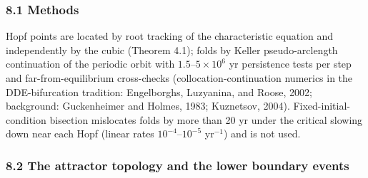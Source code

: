 \documentclass[11pt]{article}
\begin{document}
\subsubsection{8.1 Methods}\label{methods}

Hopf points are located by root tracking of the characteristic equation
and independently by the cubic (Theorem 4.1); folds by Keller
pseudo-arclength continuation of the periodic orbit with
\(1.5\)--\(5\times10^6\) yr persistence tests per step and
far-from-equilibrium cross-checks (collocation-continuation numerics in
the DDE-bifurcation tradition: Engelborghs, Luzyanina, and Roose, 2002;
background: Guckenheimer and Holmes, 1983; Kuznetsov, 2004).
Fixed-initial-condition bisection mislocates folds by more than 20 yr
under the critical slowing down near each Hopf (linear rates
\(10^{-4}\)--\(10^{-5}\) yr\(^{-1}\)) and is not used.

\subsubsection{8.2 The attractor topology and the lower boundary
events}\label{the-attractor-topology-and-the-lower-boundary-events}
\end{document}
